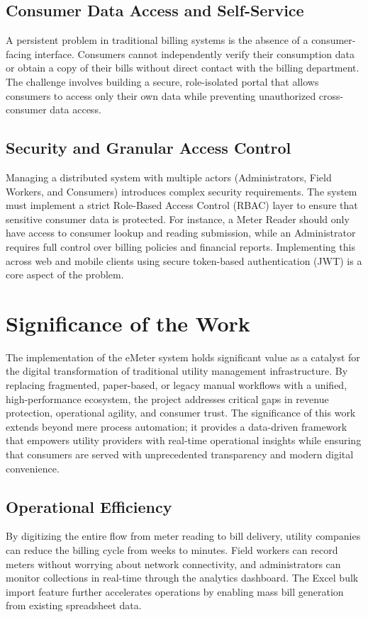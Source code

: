 \documentclass[12pt, a4paper, onecolumn]{report}
\begin{document}
\subsection{Consumer Data Access and Self-Service}
A persistent problem in traditional billing systems is the absence of a consumer-facing interface. Consumers cannot independently verify their consumption data or obtain a copy of their bills without direct contact with the billing department. The challenge involves building a secure, role-isolated portal that allows consumers to access only their own data while preventing unauthorized cross-consumer data access.

\subsection{Security and Granular Access Control}
Managing a distributed system with multiple actors (Administrators, Field Workers, and Consumers) introduces complex security requirements. The system must implement a strict Role-Based Access Control (RBAC) layer to ensure that sensitive consumer data is protected. For instance, a Meter Reader should only have access to consumer lookup and reading submission, while an Administrator requires full control over billing policies and financial reports. Implementing this across web and mobile clients using secure token-based authentication (JWT) is a core aspect of the problem.

\section{Significance of the Work}
The implementation of the eMeter system holds significant value as a catalyst for the digital transformation of traditional utility management infrastructure. By replacing fragmented, paper-based, or legacy manual workflows with a unified, high-performance ecosystem, the project addresses critical gaps in revenue protection, operational agility, and consumer trust. The significance of this work extends beyond mere process automation; it provides a data-driven framework that empowers utility providers with real-time operational insights while ensuring that consumers are served with unprecedented transparency and modern digital convenience.

\subsection{Operational Efficiency}
By digitizing the entire flow from meter reading to bill delivery, utility companies can reduce the billing cycle from weeks to minutes. Field workers can record meters without worrying about network connectivity, and administrators can monitor collections in real-time through the analytics dashboard. The Excel bulk import feature further accelerates operations by enabling mass bill generation from existing spreadsheet data.
\end{document}

